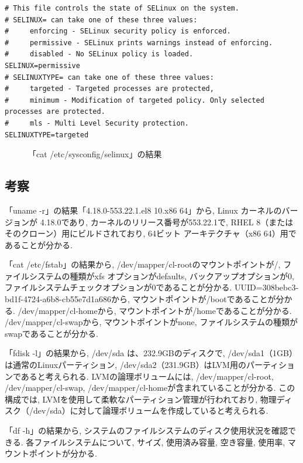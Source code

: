 \documentclass{ltjsarticle} %
\begin{document}
\begin{mdframed}
  \begin{verbatim}
# This file controls the state of SELinux on the system.
# SELINUX= can take one of these three values:
#     enforcing - SELinux security policy is enforced.
#     permissive - SELinux prints warnings instead of enforcing.
#     disabled - No SELinux policy is loaded.
SELINUX=permissive
# SELINUXTYPE= can take one of these three values:
#     targeted - Targeted processes are protected,
#     minimum - Modification of targeted policy. Only selected processes are protected.
#     mls - Multi Level Security protection.
SELINUXTYPE=targeted
  \end{verbatim}
  \end{mdframed}
  \begin{figure}[H]
  \caption{「cat /etc/sysconfig/selinux」の結果}
  \label{fig:selinux}
\end{figure}

\subsection{考察}
「uname -r」の結果「4.18.0-553.22.1.el8 10.x86 64」から, Linux カーネルのバージョンが 4.18.0であり, 
カーネルのリリース番号が553.22.1で, RHEL 8（またはそのクローン）用にビルドされており, 
64ビット アーキテクチャ（x86 64）用であることが分かる. 

「cat /etc/fstab」の結果から,  /dev/mapper/cl-rootのマウントポイントが/, ファイルシステムの種類がxfs
オプションがdefaults, バックアップオプションが0, ファイルシステムチェックオプションが0であることが分かる. 
UUID=308bebc3-bd1f-4724-a6b8-cb55e7d1a686から, マウントポイントが/bootであることが分かる. 
/dev/mapper/cl-homeから, マウントポイントが/homeであることが分かる. 
/dev/mapper/cl-swapから, マウントポイントがnone, ファイルシステムの種類がswapであることが分かる. 

「fdisk -l」の結果から, /dev/sda は、232.9GBのディスクで, /dev/sda1（1GB）は通常のLinuxパーティション, 
/dev/sda2（231.9GB）はLVM用のパーティションであると考えられる.  
LVMの論理ボリュームには, /dev/mapper/cl-root, /dev/mapper/cl-swap, 
/dev/mapper/cl-homeが含まれていることが分かる. 
この構成では, LVMを使用して柔軟なパーティション管理が行われており, 物理ディスク（/dev/sda）に対して論理ボリュームを作成していると考えられる. 

「df -h」の結果から, システムのファイルシステムのディスク使用状況を確認できる. 
各ファイルシステムについて, サイズ, 使用済み容量, 空き容量, 使用率, マウントポイントが分かる. 
\end{document}
